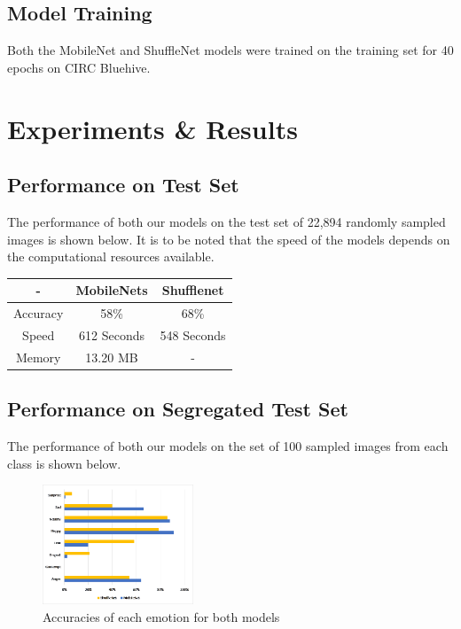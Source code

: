 \documentclass[10pt,twocolumn,letterpaper]{article}
\begin{document}
\subsection{Model Training}
Both the MobileNet and ShuffleNet models were trained on the training set for 40 epochs on CIRC Bluehive.

\section{Experiments \& Results}

\subsection{Performance on Test Set}
The performance of both our models on the test set of 22,894 randomly sampled images is shown below. It is to be noted that the speed of the models depends on the computational resources available.

\begin{center}
\begin{tabular}{ |c|c|c| } 
 \hline
 - & MobileNets & Shufflenet \\ 
 \hline
 Accuracy & 58\% & 68\% \\
 \hline
 Speed  & 612 Seconds & 548 Seconds \\ 
 \hline
 Memory & 13.20 MB & - \\ 
 \hline
\end{tabular}
\end{center}

\subsection{Performance on Segregated Test Set}

The performance of both our models on the  set of 100  sampled images from each class is shown below.

\begin{figure}[ht]
\caption{Accuracies of each emotion for both models}
\centering
\includegraphics[width=0.4\textwidth]{SegregatedAcc}
\end{figure}
\end{document}
